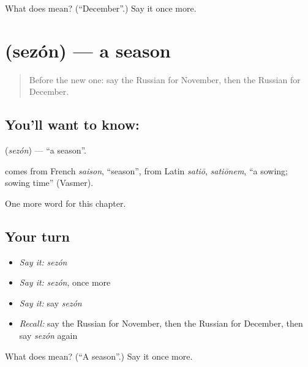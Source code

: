 \begin{tcolorbox}[breakable,colback=teal!4,colframe=teal!35!black,title={Before you move on}]
What does  mean? (\textquotedblleft{}December\textquotedblright{}.) Say it once more.
\end{tcolorbox}
\section[\texorpdfstring{\ru{сезон} (sezón)}{сезон (sezón)}]{ (sezón) — a season}

\label{lesson:RU-C240-sezon}



\begin{quote}
Before the new one: say the Russian for November, then the Russian for December.
\end{quote}

\subsection*{You'll want to know: }
\textbf{} (\emph{sezón}) — \textquotedblleft{}a season\textquotedblright{}.

\begin{cousinweb}
\textbf{} comes from French \emph{saison}, \textquotedblleft{}season\textquotedblright{}, from Latin \emph{satiō}, \emph{satiōnem}, \textquotedblleft{}a sowing; sowing time\textquotedblright{} (Vasmer).
\end{cousinweb}

\begin{grammarlens}[title={What you've built}]
One more word for this chapter.
\end{grammarlens}

\subsection*{Your turn}
\begin{itemize}
\raggedright
  \item \emph{Say it:} \emph{sezón}
  \item \emph{Say it:} \emph{sezón}, once more
  \item \emph{Say it:} say \emph{sezón}
  \item \emph{Recall:} say the Russian for November, then the Russian for December, then say \emph{sezón} again
\end{itemize}

\begin{tcolorbox}[breakable,colback=teal!4,colframe=teal!35!black,title={Before you move on}]
What does  mean? (\textquotedblleft{}A season\textquotedblright{}.) Say it once more.
\end{tcolorbox}
